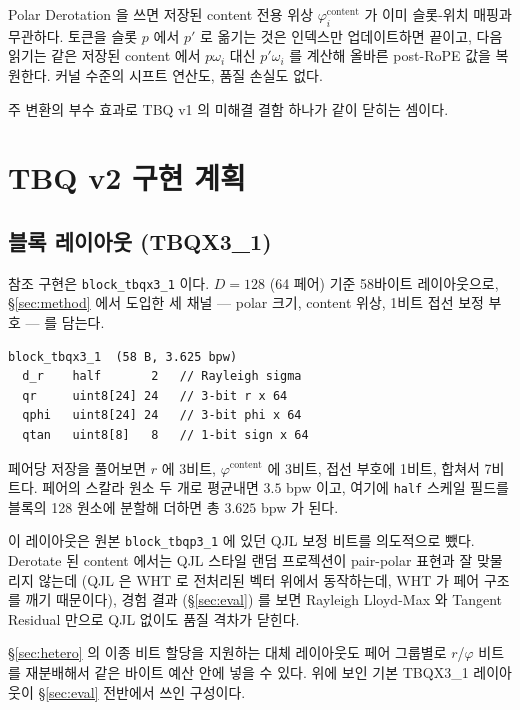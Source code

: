 \documentclass[10pt,twocolumn]{article}
\begin{document}
Polar Derotation 을 쓰면 저장된 content 전용 위상 $\varphi^{\text{content}}_i$ 가 이미 슬롯-위치 매핑과 무관하다. 토큰을 슬롯 $p$ 에서 $p'$ 로 옮기는 것은 인덱스만 업데이트하면 끝이고, 다음 읽기는 같은 저장된 content 에서 $p\omega_i$ 대신 $p'\omega_i$ 를 계산해 올바른 post-RoPE 값을 복원한다. 커널 수준의 시프트 연산도, 품질 손실도 없다.

주 변환의 부수 효과로 TBQ v1 의 미해결 결함 하나가 같이 닫히는 셈이다.

\section{TBQ v2 구현 계획}
\label{sec:impl}

\subsection{블록 레이아웃 (TBQX3\_1)}

참조 구현은 \texttt{block\_tbqx3\_1} 이다. $D=128$ (64 페어) 기준 58바이트 레이아웃으로, \S\ref{sec:method} 에서 도입한 세 채널 --- polar 크기, content 위상, 1비트 접선 보정 부호 --- 를 담는다.

{\footnotesize
\begin{verbatim}
block_tbqx3_1  (58 B, 3.625 bpw)
  d_r    half       2   // Rayleigh sigma
  qr     uint8[24] 24   // 3-bit r x 64
  qphi   uint8[24] 24   // 3-bit phi x 64
  qtan   uint8[8]   8   // 1-bit sign x 64
\end{verbatim}}

페어당 저장을 풀어보면 $r$ 에 3비트, $\varphi^{\text{content}}$ 에 3비트, 접선 부호에 1비트, 합쳐서 7비트다. 페어의 스칼라 원소 두 개로 평균내면 $3.5$ bpw 이고, 여기에 \texttt{half} 스케일 필드를 블록의 128 원소에 분할해 더하면 총 $\mathbf{3.625}$ bpw 가 된다.

이 레이아웃은 원본 \texttt{block\_tbqp3\_1} 에 있던 QJL 보정 비트를 의도적으로 뺐다. Derotate 된 content 에서는 QJL 스타일 랜덤 프로젝션이 pair-polar 표현과 잘 맞물리지 않는데 (QJL 은 WHT 로 전처리된 벡터 위에서 동작하는데, WHT 가 페어 구조를 깨기 때문이다), 경험 결과 (\S\ref{sec:eval}) 를 보면 Rayleigh Lloyd-Max 와 Tangent Residual 만으로 QJL 없이도 품질 격차가 닫힌다.

\S\ref{sec:hetero} 의 이종 비트 할당을 지원하는 대체 레이아웃도 페어 그룹별로 $r$/$\varphi$ 비트를 재분배해서 같은 바이트 예산 안에 넣을 수 있다. 위에 보인 기본 TBQX3\_1 레이아웃이 \S\ref{sec:eval} 전반에서 쓰인 구성이다.
\end{document}
